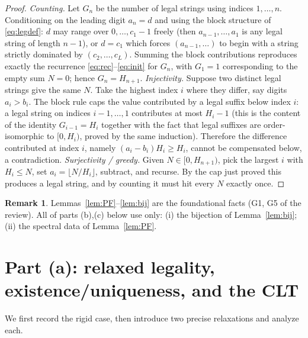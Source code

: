 \documentclass[12pt]{article}
\theoremstyle{definition}
\newtheorem{remark}{Remark}
\begin{document}
\begin{proof}
\emph{Counting.} Let $G_n$ be the number of legal strings using indices
$1,\dots,n$. Conditioning on the leading digit $a_n=d$ and using the block
structure of \eqref{eq:legdef}: $d$ may range over $0,\dots,c_1-1$ freely (then
$a_{n-1},\dots,a_1$ is any legal string of length $n-1$), or $d=c_1$ which forces
$(a_{n-1},\dots)$ to begin with a string strictly dominated by $(c_2,\dots,c_L)$.
Summing the block contributions reproduces exactly the recurrence
\eqref{eq:rec}--\eqref{eq:init} for $G_n$, with $G_1=1$ corresponding to the
empty sum $N=0$; hence $G_n=H_{n+1}$.
\emph{Injectivity.} Suppose two distinct legal strings give the same $N$. Take
the highest index $i$ where they differ, say digits $a_i>b_i$. The block rule
caps the value contributed by a legal suffix below index $i$: a legal string on
indices $i-1,\dots,1$ contributes at most $H_i-1$ (this is the content of the
identity $G_{i-1}=H_i$ together with the fact that legal suffixes are
order-isomorphic to $[0,H_i)$, proved by the same induction). Therefore the
difference contributed at index $i$, namely $(a_i-b_i)H_i\ge H_i$, cannot be
compensated below, a contradiction. \emph{Surjectivity / greedy.} Given
$N\in[0,H_{n+1})$, pick the largest $i$ with $H_i\le N$, set
$a_i=\lfloor N/H_i\rfloor$, subtract, and recurse. By the cap just proved this
produces a legal string, and by counting it must hit every $N$ exactly once.
\end{proof}

\begin{remark}
Lemmas~\ref{lem:PF}--\ref{lem:bij} are the foundational facts (G1, G5 of the
review). All of parts (b),(c) below use only: (i) the bijection of
Lemma~\ref{lem:bij}; (ii) the spectral data of Lemma~\ref{lem:PF}.
\end{remark}

\section{Part (a): relaxed legality, existence/uniqueness, and the CLT}

We first record the rigid case, then introduce two precise relaxations and
analyze each.
\end{document}

